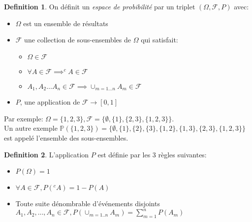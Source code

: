 \documentclass[]{book}
\theoremstyle{definition}
\newtheorem{defn}{Definition}
\newcommand{\bb}[1]{\mathbb{#1}}
\begin{document}
\begin{defn}
On d\'efinit un \emph{espace de probibilit\'e} par un triplet $(\Omega, \mathscr{F}, P)$ avec:
\begin{itemize}
\item $\Omega$ est un ensemble de r\'esultats
\item $\mathscr{F}$ une collection de sous-ensembles de $\Omega$ qui satisfait:
	\begin{itemize}
	\item $\Omega \in \mathscr{F}$
	\item $\forall A \in \mathscr{F} \implies ^{c}A \in \mathscr{F}$
	\item $A_1, A_2 \ldots A_n \in \mathscr{F} \implies \cup_{m = 1\ldots n}A_m \in \mathscr{F}$ 
	\end{itemize}
 \item $P$, une application de $\mathscr{F} \to [0,1]$
\end{itemize}
\end{defn}

Par exemple: $\Omega=\{1,2,3\}, \mathscr{F} = \{\emptyset, \{1\}, \{2,3\}, \{1,2,3\} \}$. \\

Un autre exemple $\bb{P}(\{1,2,3\}) = \{\emptyset, \{1\},  \{2\}, \{3\}, \{1,2\}, \{1,3\}, \{2,3\}, \{1,2,3\}\}$ est appel\'e l'ensemble des sous-ensembles.

\begin{defn}
L'application $P$ est d\'efinie par les 3 r\`egles suivantes:
\begin{itemize}
\item $P(\Omega) = 1$
\item $\forall A \in \mathscr{F}, P( {}^{c}A) = 1 - P(A)$
\item Toute suite d\'enombrable d'\'ev\'enements disjoints $A_1, A_2, \ldots, A_n \in \mathscr{F}, P(\cup_{m=1..n}A_m) = \sum_{m=1}^{n} P(A_m) $
\end{itemize}
\end{defn}
\end{document}
